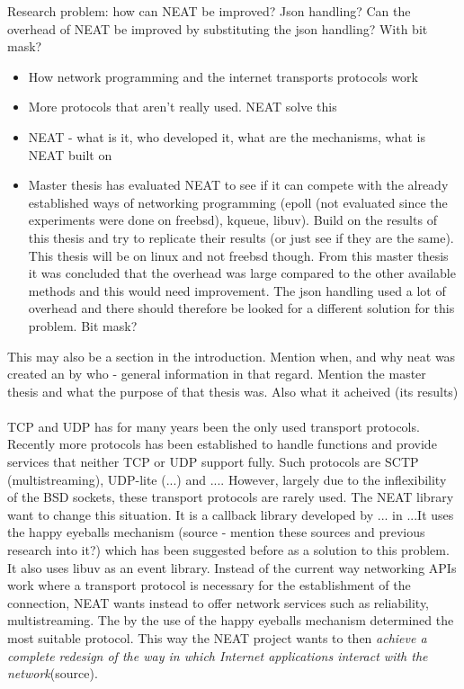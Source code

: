\documentclass[12pt]{report}
\begin{document}
Research problem: how can NEAT be improved? Json handling? Can the overhead of NEAT be improved by substituting the json handling? With bit mask?
\begin{itemize}
\item How network programming and the internet transports protocols work
\item More protocols that aren’t really used. NEAT solve this
\item NEAT - what is it, who developed it, what are the mechanisms, what is NEAT built on
\item Master thesis has evaluated NEAT to see if it can compete with the already established ways of networking programming (epoll (not evaluated since the experiments were done on freebsd), kqueue, libuv). Build on the results of this thesis and try to replicate their results (or just see if they are the same). This thesis will be on linux and not freebsd though. From this master thesis it was concluded that the overhead was large compared to the other available methods and this would need improvement. The json handling used a lot of overhead and there should therefore be looked for a different solution for this problem. Bit mask?
\end{itemize}
This may also be a section in the introduction. Mention when, and why neat was created an by who - general information in that regard. Mention the master thesis and what the purpose of that thesis was. Also what it acheived (its results) \\
\\
TCP and UDP has for many years been the only used transport protocols. Recently more protocols has been established to handle functions and provide services that neither TCP or UDP support fully. Such protocols are SCTP (multistreaming), UDP-lite (...) and .... However, largely due to the inflexibility of the BSD sockets, these transport protocols are rarely used. The NEAT library want to change this situation. It is a callback library developed by ... in ...It uses the happy eyeballs mechanism (source - mention these sources and previous research into it?) which has been suggested before as a solution to this problem. It also uses libuv as an event library. Instead of the current way networking APIs work where a transport protocol is necessary for the establishment of the connection, NEAT wants instead to offer network services such as reliability, multistreaming. The by the use of the happy eyeballs mechanism determined the most suitable protocol. This way the NEAT project wants to then \textit{achieve a complete redesign of the way in which Internet applications interact with the network}(source). 
\end{document}
